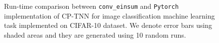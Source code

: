 \begin{figure}[!htbp]
\begin{minipage}[b]{.5\linewidth}
\centering
\resizebox{\textwidth}{!}{
   
    }
\label{fig:imagecls-cp-vs-pytorch-train}
\end{minipage}%
\hfill
\begin{minipage}[b]{.5\linewidth}
\centering
\resizebox{\textwidth}{!}{
    
    }
\label{fig:imagecls-cp-vs-pytorch-test}
\end{minipage}
\caption{Run-time comparison between \texttt{conv\_einsum} and \texttt{Pytorch} implementation of CP-TNN for image classification machine learning task implemented on CIFAR-10 dataset. We denote error bars using shaded areas and they are generated using 10 random runs. }\label{fig:imagecls-cp-vs-pytorch}
\end{figure}